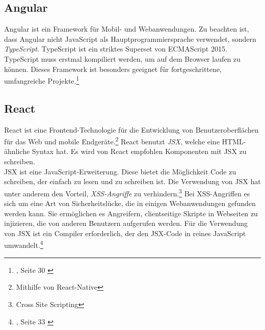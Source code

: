 \subsection*{Angular}
Angular ist ein Framework für Mobil- und Webanwendungen.
Zu beachten ist, dass Angular nicht JavaScript als Hauptprogrammiersprache verwendet, sondern \textit{TypeScript}.
TypeScript ist ein striktes Superset von ECMAScript 2015.
TypeScript muss erstmal kompiliert werden, um auf dem Browser laufen zu können{\cite{MS1}}. Dieses Framework ist besonders geeignet für fortgeschrittene, umfangreiche Projekte.\footnote{{}, Seite 30 \cite{AN1}}

\subsection*{React}
React ist eine Frontend-Technologie für die Entwicklung von Benutzeroberflächen für das Web und mobile Endgeräte\cite{GH08}.\footnote{Mithilfe von React-Native} React benutzt \textit{JSX}, welche eine HTML-ähnliche Syntax hat. Es wird von React empfohlen Komponenten mit JSX zu schreiben\cite{JSX1}. 
\\
JSX ist eine JavaScript-Erweiterung. Diese bietet die Möglichkeit Code zu schreiben, der einfach zu lesen und zu schreiben ist. Die Verwendung von JSX hat unter anderem den Vorteil, \textit{XSS-Angriffe} zu verhindern.\footnote{Cross Site Scripting{\cite{OWASP}}} \cite{JSX1} Bei XSS-Angriffen es sich um eine Art von Sicherheitslücke, die in einigen Webanwendungen gefunden werden kann. Sie ermöglichen es Angreifern, clientseitige Skripte in Webseiten zu injizieren, die von anderen Benutzern aufgerufen werden. Für die Verwendung von JSX ist ein Compiler erforderlich, der den JSX-Code in reines JavaScript umwandelt.\footnote{, Seite 33 \cite{E01}}


